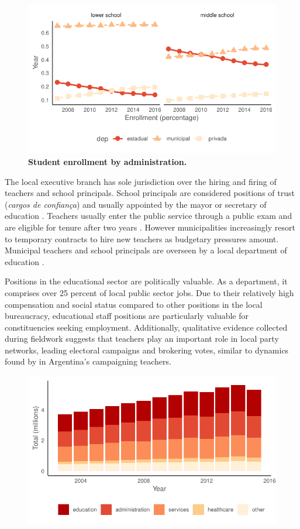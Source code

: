 \documentclass[12pt,a4paper]{article}
\begin{document}
\begin{figure}[h]
    \centering
    \includegraphics[width=0.6\linewidth]{plots/descriptive_enrollment.pdf}
    \caption{\textbf{Student enrollment by administration.}}
    \label{fig:enroll}
\end{figure}

The local executive branch has sole jurisdiction over the hiring and firing of teachers and school principals. School principals are considered positions of trust (\textit{cargos de confiança}) and usually appointed by the mayor or secretary of education \citet{brollo_victor_2017}. Teachers usually enter the public service through a public exam and are eligible for tenure after two years \citet{gatti_formacao_2010}. However municipalities increasingly resort to temporary contracts to hire new teachers as budgetary pressures amount. Municipal teachers and school principals are overseen by a local department of education \citep{militao_educacao_2014}.

Positions in the educational sector are politically valuable. As a department, it comprises over 25 percent of local public sector jobs. Due to their relatively high compensation and social status compared to other positions in the local bureaucracy, educational staff positions are particularly valuable for constituencies seeking employment. Additionally, qualitative evidence collected during fieldwork suggests that teachers play an important role in local party networks, leading electoral campaigns and brokering votes, similar to dynamics found by \citet{oliveros_making_2016} in Argentina's campaigning teachers.

\begin{figure}[h]
    \centering
    \includegraphics[width=0.6\linewidth]{plots/descriptive_staff_breakdown}
\end{figure}
\end{document}
